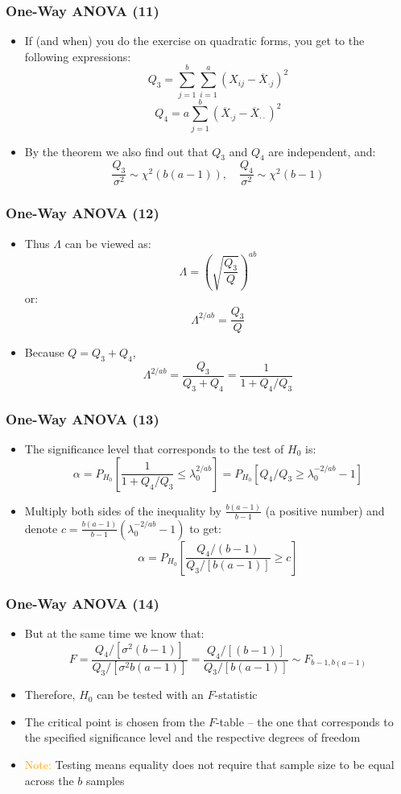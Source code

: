 \documentclass[10pt]{beamer}
\theoremstyle{definition}
\begin{document}
\begin{frame}[fragile]
\frametitle{One-Way ANOVA (11)}
\begin{itemize}
	\item If (and when) you do the exercise on quadratic forms, you get to the following expressions:
	\[
		Q_{3} = \sum_{j=1}^{b}\sum_{i=1}^{a}(X_{ij} - \overline{X}_{\cdot j})^{2}
	\]
	\[
		Q_{4} = a\sum_{j=1}^{b}(\overline{X}_{\cdot j} - \overline{X}_{\cdot \cdot})^{2}
	\]
	\item By the theorem we also find out that $Q_{3}$ and $Q_{4}$ are independent, and:
	\[
		\frac{Q_{3}}{\sigma^{2}} \sim \chi^{2}(b(a-1)), \quad \frac{Q_{4}}{\sigma^{2}} \sim \chi^{2}(b-1)
	\]
\end{itemize}
\end{frame}

\begin{frame}[fragile]
\frametitle{One-Way ANOVA (12)}
\begin{itemize}
	\item Thus $\Lambda$ can be viewed as:
	\[
		\Lambda = \left(\sqrt{\frac{Q_{3}}{Q}}\right)^{ab}
	\]
	or:
	\[
		\Lambda^{2/ab} = \frac{Q_{3}}{Q}
	\]
	\item Because $Q = Q_{3} + Q_{4}$,
	\[
		\Lambda^{2/ab} = \frac{Q_{3}}{Q_{3} + Q_{4}} = \frac{1}{1 + Q_{4}/Q_{3}}
	\]
\end{itemize}
\end{frame}

\begin{frame}[fragile]
\frametitle{One-Way ANOVA (13)}
\begin{itemize}
	\item The significance level that corresponds to the test of $H_{0}$ is:
	\[
		\alpha = P_{H_{0}}\left[\frac{1}{1 + Q_{4}/Q_{3}} \leq \lambda_{0}^{2/ab}\right] = P_{H_{0}}\left[Q_{4}/Q_{3} \geq \lambda_{0}^{-2/ab} - 1\right]
	\]
	\item Multiply both sides of the inequality by $\displaystyle \frac{b(a-1)}{b-1}$ (a positive number) and denote $\displaystyle c = \displaystyle \frac{b(a-1)}{b-1}(\lambda_{0}^{-2/ab} - 1)$ to get:
	\[
		\alpha = P_{H_{0}}\left[\frac{Q_{4}/(b-1)}{Q_{3}/[b(a-1)]} \geq c\right]
	\]
\end{itemize}
\end{frame}

\begin{frame}[fragile]
\frametitle{One-Way ANOVA (14)}
\begin{itemize}
	\item But at the same time we know that:
	\[
		F = \frac{Q_{4}/[\sigma^{2}(b-1)]}{Q_{3}/[\sigma^{2}b(a-1)]} = \frac{Q_{4}/[(b-1)]}{Q_{3}/[b(a-1)]} \sim F_{b-1, b(a-1)}
	\]
	\item Therefore, $H_{0}$ can be tested with an $F$-statistic
	\item The critical point is chosen from the $F$-table -- the one that corresponds to the specified significance level and the respective degrees of freedom
	\item \textcolor{orange}{Note:} Testing means equality does not require that sample size to be equal across the $b$ samples
\end{itemize}
\end{frame}
\end{document}
